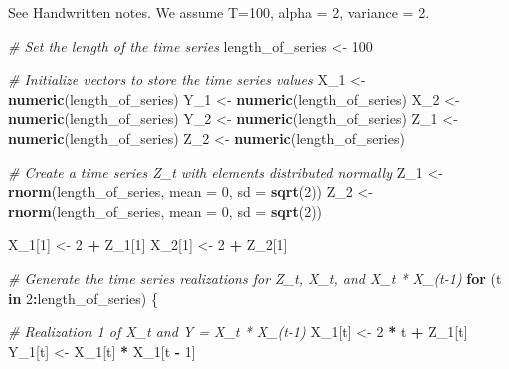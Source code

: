 \documentclass[
]{article}
\newenvironment{Shaded}{\begin{snugshade}}{\end{snugshade}}
\newcommand{\AttributeTok}[1]{\textcolor[rgb]{0.13,0.29,0.53}{#1}}
\newcommand{\CommentTok}[1]{\textcolor[rgb]{0.56,0.35,0.01}{\textit{#1}}}
\newcommand{\ControlFlowTok}[1]{\textcolor[rgb]{0.13,0.29,0.53}{\textbf{#1}}}
\newcommand{\DecValTok}[1]{\textcolor[rgb]{0.00,0.00,0.81}{#1}}
\newcommand{\FunctionTok}[1]{\textcolor[rgb]{0.13,0.29,0.53}{\textbf{#1}}}
\newcommand{\NormalTok}[1]{#1}
\newcommand{\OtherTok}[1]{\textcolor[rgb]{0.56,0.35,0.01}{#1}}
\newcommand{\SpecialCharTok}[1]{\textcolor[rgb]{0.81,0.36,0.00}{\textbf{#1}}}
\begin{document}
See Handwritten notes. We assume T=100, alpha = 2, variance = 2.

\begin{Shaded}
\begin{Highlighting}[]
\CommentTok{\# Set the length of the time series}
\NormalTok{length\_of\_series }\OtherTok{\textless{}{-}} \DecValTok{100}

\CommentTok{\# Initialize vectors to store the time series values}
\NormalTok{X\_1 }\OtherTok{\textless{}{-}} \FunctionTok{numeric}\NormalTok{(length\_of\_series)}
\NormalTok{Y\_1 }\OtherTok{\textless{}{-}} \FunctionTok{numeric}\NormalTok{(length\_of\_series)}
\NormalTok{X\_2 }\OtherTok{\textless{}{-}} \FunctionTok{numeric}\NormalTok{(length\_of\_series)}
\NormalTok{Y\_2 }\OtherTok{\textless{}{-}} \FunctionTok{numeric}\NormalTok{(length\_of\_series)}
\NormalTok{Z\_1 }\OtherTok{\textless{}{-}} \FunctionTok{numeric}\NormalTok{(length\_of\_series)}
\NormalTok{Z\_2 }\OtherTok{\textless{}{-}} \FunctionTok{numeric}\NormalTok{(length\_of\_series)}


\CommentTok{\# Create a time series Z\_t with elements distributed normally}
\NormalTok{Z\_1 }\OtherTok{\textless{}{-}} \FunctionTok{rnorm}\NormalTok{(length\_of\_series, }\AttributeTok{mean =} \DecValTok{0}\NormalTok{, }\AttributeTok{sd =} \FunctionTok{sqrt}\NormalTok{(}\DecValTok{2}\NormalTok{))}
\NormalTok{Z\_2 }\OtherTok{\textless{}{-}} \FunctionTok{rnorm}\NormalTok{(length\_of\_series, }\AttributeTok{mean =} \DecValTok{0}\NormalTok{, }\AttributeTok{sd =} \FunctionTok{sqrt}\NormalTok{(}\DecValTok{2}\NormalTok{))}

\NormalTok{X\_1[}\DecValTok{1}\NormalTok{] }\OtherTok{\textless{}{-}} \DecValTok{2} \SpecialCharTok{+}\NormalTok{ Z\_1[}\DecValTok{1}\NormalTok{]}
\NormalTok{X\_2[}\DecValTok{1}\NormalTok{] }\OtherTok{\textless{}{-}} \DecValTok{2} \SpecialCharTok{+}\NormalTok{ Z\_2[}\DecValTok{1}\NormalTok{]}

\CommentTok{\# Generate the time series realizations for Z\_t, X\_t, and X\_t * X\_(t{-}1)}
\ControlFlowTok{for}\NormalTok{ (t }\ControlFlowTok{in} \DecValTok{2}\SpecialCharTok{:}\NormalTok{length\_of\_series) \{}
  
  \CommentTok{\# Realization 1 of X\_t and Y = X\_t * X\_(t{-}1)}
\NormalTok{  X\_1[t] }\OtherTok{\textless{}{-}} \DecValTok{2} \SpecialCharTok{*}\NormalTok{ t }\SpecialCharTok{+}\NormalTok{ Z\_1[t]}
\NormalTok{  Y\_1[t] }\OtherTok{\textless{}{-}}\NormalTok{ X\_1[t] }\SpecialCharTok{*}\NormalTok{ X\_1[t }\SpecialCharTok{{-}} \DecValTok{1}\NormalTok{]}
  

\end{Highlighting}
\end{Shaded}
\end{document}
